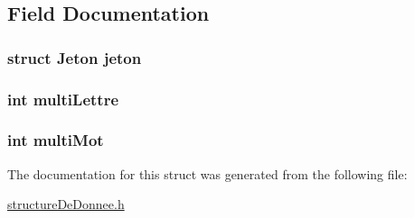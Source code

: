 \subsection{Field Documentation}
\hypertarget{struct_case_a9f4b5819c5c0a86e2652b81fef1daada}{
\subsubsection[{jeton}]{\setlength{\rightskip}{0pt plus 5cm}struct {\bf Jeton} jeton}}\label{struct_case_a9f4b5819c5c0a86e2652b81fef1daada}
\hypertarget{struct_case_a6f17e7aa98aefcb66a93b9933e3eb107}{
\subsubsection[{multi\-Lettre}]{\setlength{\rightskip}{0pt plus 5cm}int multi\-Lettre}}\label{struct_case_a6f17e7aa98aefcb66a93b9933e3eb107}
\hypertarget{struct_case_a221f7ea49ba6862c68e57d4f3771d649}{
\subsubsection[{multi\-Mot}]{\setlength{\rightskip}{0pt plus 5cm}int multi\-Mot}}\label{struct_case_a221f7ea49ba6862c68e57d4f3771d649}


The documentation for this struct was generated from the following file\-:\begin{DoxyCompactItemize}
\item 
\hyperlink{structure_de_donnee_8h}{structure\-De\-Donnee.\-h}\end{DoxyCompactItemize}
